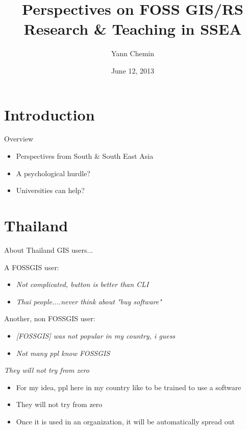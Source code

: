 \documentclass[xcolor=dvipsnames,beamer]{beamer} %
\title[The Mountains and the Ants]
{Perspectives on FOSS GIS/RS \\Research \& Teaching in SSEA}
\author[Yann Chemin]
{Yann Chemin}
\institute[U. of Moratuwa - IWMI]
{International Water Management Institute\\ University of Moratuwa
\vspace{20pt}
}
\date{June 12, 2013}
\begin{document}
\frame{
\titlepage
}

\section{Introduction}
\begin{frame}[fragile]{Overview}



\begin{itemize}
 \item Perspectives from South \& South East Asia
 \item A psychological hurdle?
 \item Universities can help?
\end{itemize}


\end{frame}

\section{Thailand}
\begin{frame}[fragile]{About Thailand GIS users...}

A FOSSGIS user:
\begin{itemize}
 \item {\it Not complicated, button is better than CLI}
 \item {\it Thai people....never think about "buy software"}
\end{itemize}

Another, non FOSSGIS user:
\begin{itemize}
 \item {\it [FOSSGIS] was not popular in my country, i guess}
 \item {\it Not many ppl know FOSSGIS}
\end{itemize}

\begin{block}{{\it They will not try from zero}}
\begin{itemize}
\item For my idea, ppl here in my country like to be trained to use a software
\item They will not try from zero
\item Once it is used in an organization, it will be automatically spread out
\end{itemize}
\end{block}

\end{frame}
\end{document}
